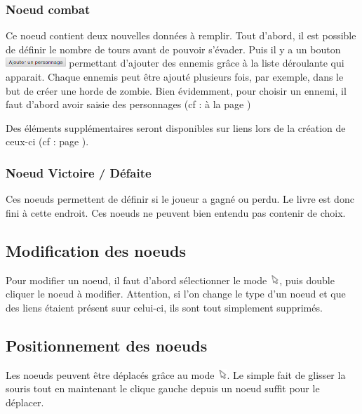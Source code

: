 			\subsubsection{Noeud combat}
				\label{subsubsec:combat}

				Ce noeud contient deux nouvelles données à remplir. Tout d'abord, il est possible de définir le nombre de tours avant de pouvoir s'évader. Puis il y a un bouton \includegraphics[height=10pt]{img/noeudAddPersonnage} permettant d'ajouter des ennemis grâce à la liste déroulante qui apparait. Chaque ennemis peut être ajouté plusieurs fois, par exemple, dans le but de créer une horde de zombie. Bien évidemment, pour choisir un ennemi, il faut d'abord avoir saisie des personnages (cf :  à la page \pageref{sec:perso})

				Des éléments supplémentaires seront disponibles sur liens lors de la création de ceux-ci (cf :  page \pageref{subsubsec:lienCombat}).

			\subsubsection{Noeud Victoire / Défaite}

				Ces noeuds permettent de définir si le joueur a gagné ou perdu. Le livre est donc fini à cette endroit. Ces noeuds ne peuvent bien entendu pas contenir de choix.

		\subsection{Modification des noeuds}

			Pour modifier un noeud, il faut d'abord sélectionner le mode \includegraphics[height=10pt, keepaspectratio]{img/icons/select.png}, puis double cliquer le noeud à modifier. Attention, si l'on change le type d'un noeud et que des liens étaient présent suur celui-ci, ils sont tout simplement supprimés.

		\subsection{Positionnement des noeuds}

			Les noeuds peuvent être déplacés grâce au mode \includegraphics[height=10pt]{img/icons/select.png}. Le simple fait de glisser la souris tout en maintenant le clique gauche depuis un noeud suffit pour le déplacer.


